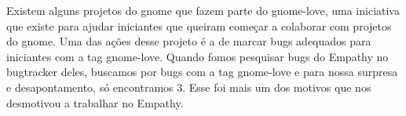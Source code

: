 Existem alguns projetos do gnome que fazem parte do gnome-love, uma iniciativa que existe para ajudar iniciantes que queiram começar a colaborar com projetos do gnome. Uma das ações desse projeto é a de marcar bugs adequados para iniciantes com a tag gnome-love.
Quando fomos pesquisar bugs do Empathy no bugtracker deles, buscamos por bugs com a tag gnome-love e para nossa surpresa e desapontamento, só encontramos 3. Esse foi mais um dos motivos que nos desmotivou a trabalhar no Empathy.